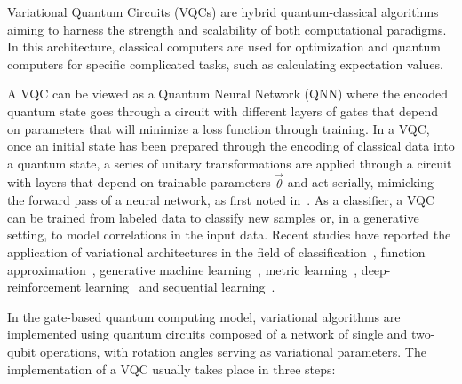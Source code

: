 Variational Quantum Circuits (VQCs) are hybrid quantum-classical algorithms aiming to harness the strength and scalability of both computational paradigms.
In this architecture, classical computers are used for optimization and quantum computers for specific complicated tasks, such as calculating expectation values. 

A VQC can be viewed as a Quantum Neural Network (QNN) where the encoded quantum state goes through a circuit with different layers of gates that depend on parameters that will minimize a loss function through training.
In a VQC, once an initial state has been prepared through the encoding of classical data into a quantum state, a series of unitary transformations are applied through a circuit with layers that depend on trainable parameters $\vec{\theta}$ and act serially, mimicking the forward pass of a neural network, as first noted in~\cite{Abbas2021}.
As a classifier, a VQC can be trained from labeled data to classify new samples or, in a generative setting, to model correlations in the input data.
Recent studies have reported the application of variational architectures in the field of classification~\cite{Benedetti2019}, function approximation~\cite{Mitarai2018}, generative machine learning~\cite{dallaire2018quantum, zoufal2021variational}, metric learning~\cite{quantumembeddings}, deep-reinforcement learning~\cite{var_deeplearning} and sequential learning~\cite{qrnn}.

In the gate-based quantum computing model, variational algorithms are implemented using quantum circuits composed of a network of single and two-qubit operations, with rotation angles serving as variational parameters.
The implementation of a VQC usually takes place in three steps:

